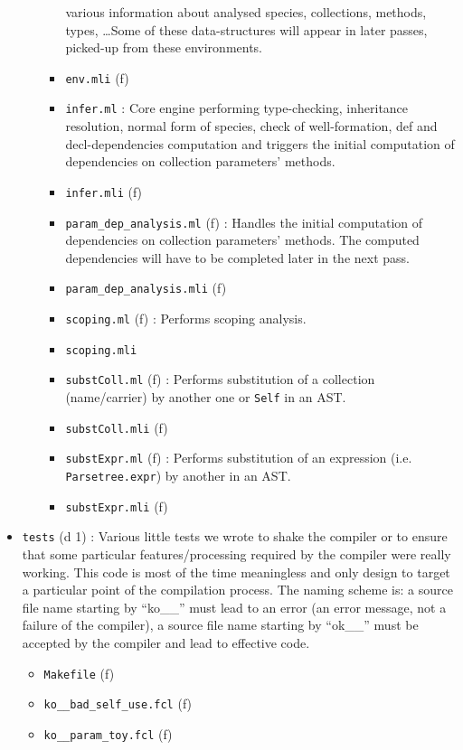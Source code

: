 \begin{itemize}
\begin{itemize}
\begin{itemize}
      various information about analysed species, collections,
      methods, types, \ldots Some of these data-structures will appear
      in later passes, picked-up from these environments.
    \item {\tt env.mli} (f)
    \item {\tt infer.ml} : Core engine performing type-checking,
      inheritance resolution, normal form of species, check of
      well-formation, def and decl-dependencies computation and
      triggers the initial computation of dependencies on collection
      parameters' methods.
    \item {\tt infer.mli} (f)
    \item {\tt param\_dep\_analysis.ml} (f) : Handles the initial
      computation of dependencies on collection parameters'
      methods. The computed dependencies will have to be completed
      later in the next pass.
    \item {\tt param\_dep\_analysis.mli} (f)
    \item {\tt scoping.ml} (f) : Performs scoping analysis.
    \item {\tt scoping.mli}
    \item {\tt substColl.ml} (f) : Performs substitution of a
      collection (name/carrier) by another one or {\tt Self} in an
      AST.
    \item {\tt substColl.mli} (f)
    \item {\tt substExpr.ml} (f) : Performs substitution of an
    expression (i.e. {\tt Parsetree.expr}) by another in an AST.
    \item {\tt substExpr.mli} (f)
    \end{itemize}
  \end{itemize}
\item {\tt tests} (d 1) : Various little tests we wrote to shake the
  compiler or to ensure that some particular features/processing
  required by the compiler were really working. This code is most of
  the time meaningless and only design to target a particular point of
  the compilation process. The naming scheme is: a source file name
  starting by ``ko\_\_'' must lead to an error (an error message, not
  a failure of the compiler), a source file name starting by
  ``ok\_\_'' must be accepted by the compiler and lead to effective
  code.
  \begin{itemize}
  \item {\tt Makefile} (f)
  \item {\tt ko\_\_bad\_self\_use.fcl} (f)
  \item {\tt ko\_\_param\_toy.fcl} (f)

\end{itemize}
\end{itemize}
